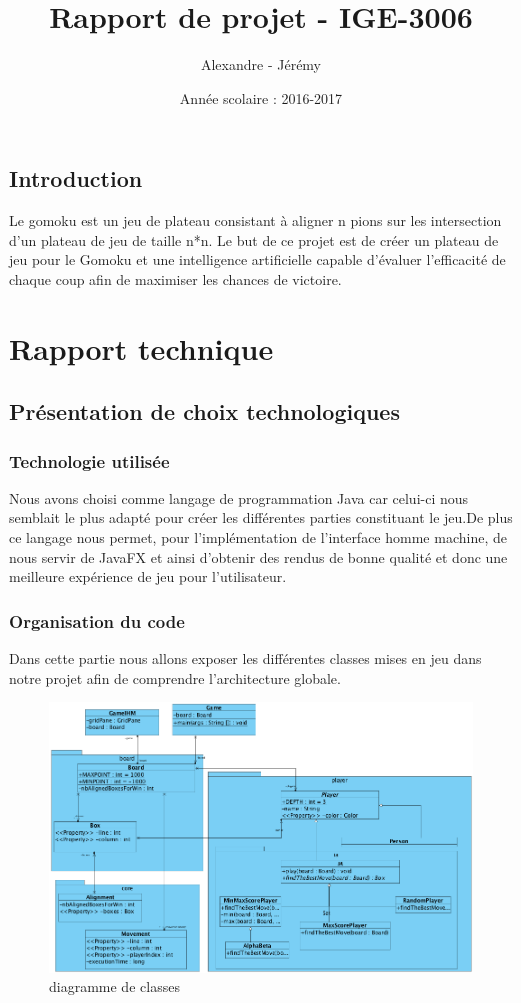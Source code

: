 \documentclass{report}
\title{Rapport de projet - IGE-3006}
\author{Alexandre \bsc{Causse} - Jérémy \bsc{Fornarino}}
\date{Année scolaire : 2016-2017}
\begin{document}
\maketitle

\renewcommand{\contentsname}{Sommaire} 
\tableofcontents
\listoffigures
\newpage

\chapter*{Introduction}
Le gomoku est un jeu de plateau consistant à aligner n pions sur les intersection d'un plateau de jeu de taille n*n.
Le but de ce projet est de créer un plateau de jeu pour le Gomoku et une intelligence artificielle capable d'évaluer l'efficacité de chaque coup afin de maximiser les chances de victoire.


\part{Rapport technique}
	\chapter{Présentation de choix technologiques}
		\section{Technologie utilisée}
Nous avons choisi comme langage de programmation Java car celui-ci nous semblait le plus adapté pour créer les différentes parties constituant le jeu.De plus ce langage nous permet, pour l'implémentation de l'interface homme machine, de nous servir de JavaFX et ainsi d'obtenir des rendus de bonne qualité et donc une meilleure expérience de jeu pour l'utilisateur.
		\section{Organisation du code}
		Dans cette partie nous allons exposer les différentes classes mises en jeu dans notre projet afin de comprendre l'architecture globale. 
\begin{figure}	\caption{\label{étiquette} diagramme de classes}
\includegraphics[scale=0.25]{diagrammeDeClasses.png} 
\end{figure}
\end{document}
